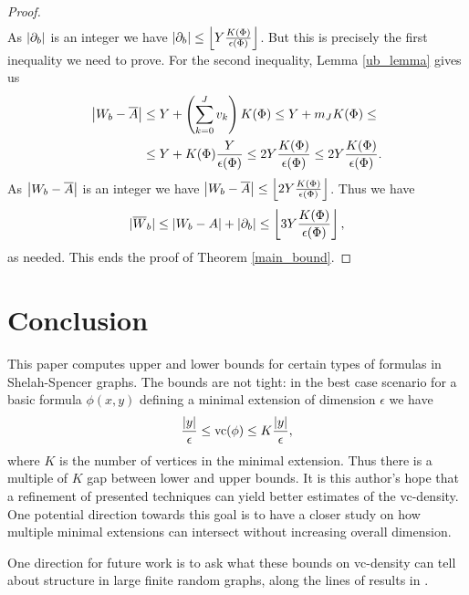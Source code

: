 \documentclass{amsart}
\begin{document}
\begin{proof}
\begin{align*}
  \end{align*}
  As $|\partial_b|$ is an integer we have $|\partial_b| \leq \left \lfloor Y \frac{K(\Phi)}{\epsilon(\Phi)} \right \rfloor$.
  But this is precisely the first inequality we need to prove.
  For the second inequality, Lemma \ref{ub_lemma} gives us
  \begin{align*}
    \left|W_b - \overline{A}\right| &\leq Y + \left(\sum_{k=0}^J v_{k}\right) K(\Phi) \leq Y + m_J K(\Phi) \leq \\
    &\leq Y + K(\Phi) \frac{Y}{\epsilon(\Phi)} \leq 2Y \frac{K(\Phi)}{\epsilon(\Phi)} \leq 2 Y \frac{K(\Phi)}{\epsilon(\Phi)}.
  \end{align*}
  As $\left|W_b - \overline{A}\right|$ is an integer we have $\left|W_b - \overline{A}\right| \leq \left \lfloor 2 Y \frac{K(\Phi)}{\epsilon(\Phi)} \right \rfloor$.
  Thus we have
  \begin{align*}
      |{\overline{W}}_b| \leq \left|W_b - A\right| + \left|\partial_b\right| \leq \left \lfloor 3 Y \frac{K(\Phi)}{\epsilon(\Phi)} \right \rfloor,
  \end{align*}
  as needed.
  This ends the proof of Theorem \ref{main_bound}.
\end{proof}


\section{Conclusion}
This paper computes upper and lower bounds for certain types of formulas in Shelah-Spencer graphs.
The bounds are not tight: in the best case scenario for a basic formula $\phi(x,y)$ defining a minimal extension of
dimension $\epsilon$ we have
\begin{align*}
  \frac{|y|}{\epsilon} \leq \operatorname{vc}(\phi) \leq K \frac{|y|}{\epsilon},
\end{align*}
where $K$ is the number of vertices in the minimal extension.
Thus there is a multiple of $K$ gap between lower and upper bounds.
It is this author's hope that a refinement of presented techniques can yield better estimates of the vc-density.
One potential direction towards this goal is to have a closer study on
how multiple minimal extensions can intersect without increasing overall dimension.

One direction for future work is to ask what these bounds on vc-density can tell about structure in large finite random graphs, along the lines of results in \cite{anthony}.
\end{document}
